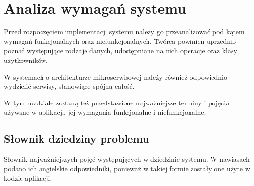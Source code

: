 \clearpage %

\section{Analiza wymagań systemu}

Przed rozpoczęciem implementacji systemu należy go przeanalizować pod kątem wymagań funkcjonalnych oraz niefunkcjonalnych. Twórca powinien uprzednio poznać występujące rodzaje danych, udostępniane na nich operacje oraz klasy użytkowników.

W systemach o architekturze mikroserwisowej należy również odpowiednio wydzielić serwisy, stanowiące spójną całość.

W tym rozdziale zostaną też przedstawione najważniejsze terminy i pojęcia używane w aplikacji, jej wymagania funkcjonalne i niefunkcjonalne.

\subsection{Słownik dziedziny problemu}

Słownik najważniejszych pojęć występujących w dziedzinie systemu. W nawiasach podano ich angielskie odpowiedniki, ponieważ w takiej formie zostały one użyte w kodzie aplikacji.


